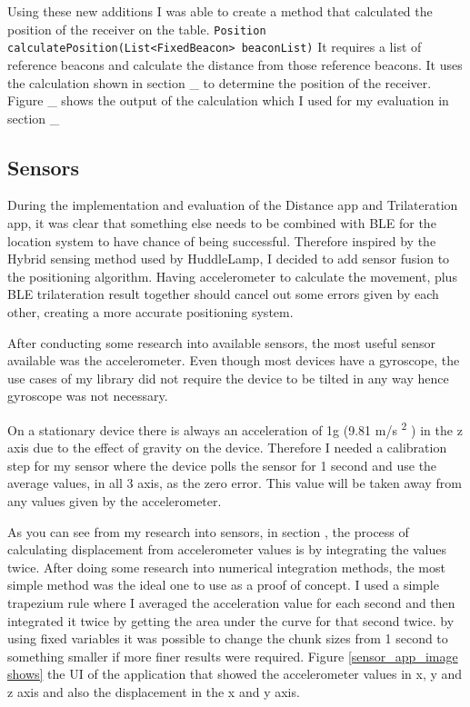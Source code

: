 Using these new additions I was able to create a method that calculated the position of the receiver on the table. \lstinline|Position calculatePosition(List<FixedBeacon> beaconList)| It requires a list of reference beacons and calculate the distance from those reference beacons. It uses the calculation shown in section \_ to determine the position of the receiver. 
Figure \_ shows the output of the calculation which I used for my evaluation in section \_

\subsection{Sensors} \label{nocamera_sensors}
During the implementation and evaluation of the Distance app and Trilateration app, it was clear that something else needs to be combined with BLE for the location system to have chance of being successful. Therefore inspired by the Hybrid sensing method used by HuddleLamp, I decided to add sensor fusion to the positioning algorithm. Having accelerometer to calculate the movement, plus BLE trilateration result together should cancel out some errors given by each other, creating a more accurate positioning system.

After conducting some research into available sensors, the most useful sensor available was the accelerometer. Even though most devices have a gyroscope, the use cases of my library did not require the device to be tilted in any way hence gyroscope was not necessary. 

On a stationary device there is always an acceleration of 1g (9.81 m/s \textsuperscript{2} )
in the z axis due to the effect of gravity on the device. Therefore I needed a calibration step for my sensor where the device polls the sensor for 1 second and use the average values, in all 3 axis, as the zero error. This value will be taken away from any values given by the accelerometer.

As you can see from my research into sensors, in section , the process of calculating displacement from accelerometer values is by integrating the values twice. After doing some research into numerical integration methods, the most simple method was the ideal one to use as a proof of concept. I used a simple trapezium rule where I averaged the acceleration value for each second and then integrated it twice by getting the area under the curve for that second twice. by using fixed variables it was possible to change the chunk sizes from 1 second to something smaller if more finer results were required.
Figure \ref{sensor_app_image shows} the UI of the application that showed the accelerometer values in x, y and z axis and also the displacement in the x and y axis.

